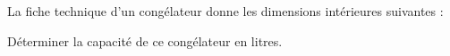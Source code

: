 \begin{exercice} %
   La fiche technique d'un congélateur donne les dimensions intérieures suivantes :
   \begin{center}
   \end{center}
   Déterminer la capacité de ce congélateur en litres.
\end{exercice}
